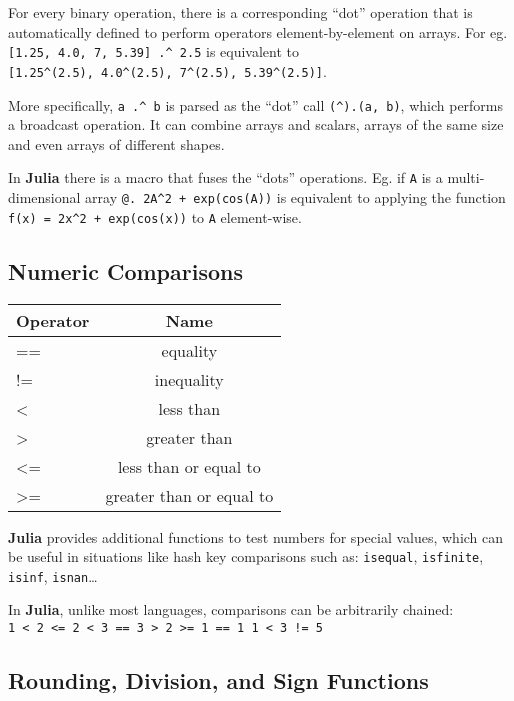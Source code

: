 \documentclass[
]{article}
\begin{document}
For every binary operation, there is a corresponding ``dot'' operation
that is automatically defined to perform operators element-by-element on
arrays. For eg. \texttt{{[}1.25,\ 4.0,\ 7,\ 5.39{]}\ .\^{}\ 2.5} is
equivalent to
\texttt{{[}1.25\^{}(2.5),\ 4.0\^{}(2.5),\ 7\^{}(2.5),\ 5.39\^{}(2.5){]}}.

More specifically, \texttt{a\ .\^{}\ b} is parsed as the ``dot'' call
\texttt{(\^{}).(a,\ b)}, which performs a broadcast operation. It can
combine arrays and scalars, arrays of the same size and even arrays of
different shapes.

In \textbf{Julia} there is a macro that fuses the ``dots'' operations.
Eg. if \texttt{A} is a multi-dimensional array
\texttt{@.\ 2A\^{}2\ +\ exp(cos(A))} is equivalent to applying the
function \texttt{f(x)\ =\ 2x\^{}2\ +\ exp(cos(x))} to \texttt{A}
element-wise.

\hypertarget{numeric-comparisons}{%
\subsection{Numeric Comparisons}\label{numeric-comparisons}}

\begin{longtable}[]{@{}lc@{}}
\toprule\noalign{}
Operator & Name \\
\midrule\noalign{}
\endhead
\bottomrule\noalign{}
\endlastfoot
== & equality \\
!= & inequality \\
\textless{} & less than \\
\textgreater{} & greater than \\
\textless= & less than or equal to \\
\textgreater= & greater than or equal to \\
\end{longtable}

\textbf{Julia} provides additional functions to test numbers for special
values, which can be useful in situations like hash key comparisons such
as: \texttt{isequal}, \texttt{isfinite}, \texttt{isinf},
\texttt{isnan}\ldots{}

In \textbf{Julia}, unlike most languages, comparisons can be arbitrarily
chained:
\texttt{1\ \textless{}\ 2\ \textless{}=\ 2\ \textless{}\ 3\ ==\ 3\ \textgreater{}\ 2\ \textgreater{}=\ 1\ ==\ 1\ 1\ \textless{}\ 3\ !=\ 5}

\hypertarget{rounding-division-and-sign-functions}{%
\subsection{Rounding, Division, and Sign
Functions}\label{rounding-division-and-sign-functions}}
\end{document}
